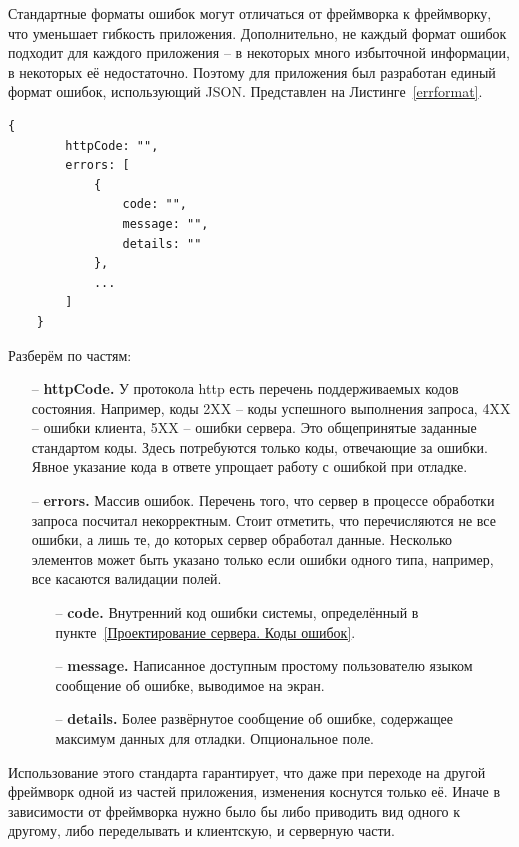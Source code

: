 \documentclass[a4paper,article]{article}
\begin{document}
\begin{sloppypar}
    Стандартные форматы ошибок могут отличаться от фреймворка к фреймворку, что уменьшает гибкость приложения. Дополнительно, не каждый формат ошибок подходит для каждого приложения -- в некоторых много избыточной информации, в некоторых её недостаточно. Поэтому для приложения был разработан единый формат ошибок, использующий JSON. Представлен на Листинге~\ref{errformat}.

    \begin{lstlisting}[label=errformat,caption=Формат ошибок]
    {
        httpCode: "",
        errors: [
            {
                code: "",
                message: "",
                details: ""
            },
            ...
        ]
    }
    \end{lstlisting}

    Разберём по частям:

    \begin{itemize}[nolistsep]
        \item[--] \textbf{httpCode.} У протокола http есть перечень поддерживаемых кодов состояния. Например, коды 2XX -- коды успешного выполнения запроса, 4XX -- ошибки клиента, 5XX -- ошибки сервера. Это общепринятые заданные стандартом коды. Здесь потребуются только коды, отвечающие за ошибки. Явное указание кода в ответе упрощает работу с ошибкой при отладке.
        \item[--] \textbf{errors.} Массив ошибок. Перечень того, что сервер в процессе обработки запроса посчитал некорректным. Стоит отметить, что перечисляются не все ошибки, а лишь те, до которых сервер обработал данные. Несколько элементов может быть указано только если ошибки одного типа, например, все касаются валидации полей.
        \begin{itemize}[nolistsep]
            \item[--] \textbf{code.} Внутренний код ошибки системы, определённый в пункте~\ref{Проектирование сервера. Коды ошибок}.
            \item[--] \textbf{message.} Написанное доступным простому пользователю языком сообщение об ошибке, выводимое на экран.
            \item[--] \textbf{details.} Более развёрнутое сообщение об ошибке, содержащее максимум данных для отладки. Опциональное поле.
        \end{itemize}
    \end{itemize}

    Использование этого стандарта гарантирует, что даже при переходе на другой фреймворк одной из частей приложения, изменения коснутся только её. Иначе в зависимости от фреймворка нужно было бы либо приводить вид одного к другому, либо переделывать и клиентскую, и серверную части.


\end{sloppypar}
\end{document}
